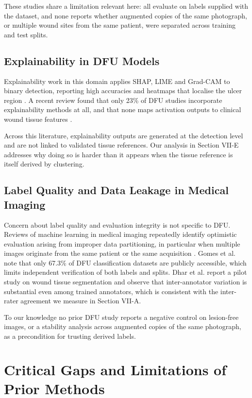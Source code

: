 These studies share a limitation relevant here: all evaluate on labels
supplied with the dataset, and none reports whether augmented copies of the
same photograph, or multiple wound sites from the same patient, were
separated across training and test splits.

\subsection{Explainability in DFU Models}

Explainability work in this domain applies SHAP, LIME and Grad-CAM to
binary detection, reporting high accuracies and heatmaps that localise
the ulcer region \cite{rathore2025,mahmud2025}. A recent
review found that only 23\% of DFU studies incorporate explainability
methods at all, and that none maps activation outputs to clinical wound
tissue features \cite{liu2025review}.

Across this literature, explainability outputs are generated at the
detection level and are not linked to validated tissue references. Our
analysis in Section VII-E addresses why doing so is harder than it appears
when the tissue reference is itself derived by clustering.

\subsection{Label Quality and Data Leakage in Medical Imaging}

Concern about label quality and evaluation integrity is not specific to
DFU. Reviews of machine learning in medical imaging repeatedly identify
optimistic evaluation arising from improper data partitioning, in
particular when multiple images originate from the same patient or the same
acquisition \cite{yap2021,silva2025}. Gomes et al. \cite{gomes2025} note
that only 67.3\% of DFU classification datasets are publicly accessible,
which limits independent verification of both labels and splits. Dhar et
al. \cite{dhar2024} report a pilot study on wound tissue segmentation and
observe that inter-annotator variation is substantial even among trained
annotators, which is consistent with the inter-rater agreement we measure
in Section VII-A.

To our knowledge no prior DFU study reports a negative control on
lesion-free images, or a stability analysis across augmented copies of the
same photograph, as a precondition for trusting derived labels.

\section{Critical Gaps and Limitations of Prior Methods}

